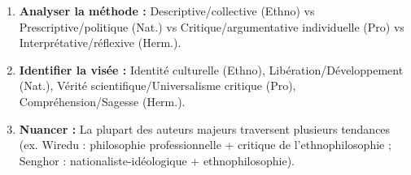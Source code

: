 \documentclass[11pt]{article}
\newcommand{\cle}[1]{{\popxbold\color{popdark}#1}}
\begin{document}
\begin{methode}
\begin{enumerate}
    \item \textbf{Analyser la méthode :} \cle{Descriptive/collective} (Ethno) vs \cle{Prescriptive/politique} (Nat.) vs \cle{Critique/argumentative individuelle} (Pro) vs \cle{Interprétative/réflexive} (Herm.).
    \item \textbf{Identifier la visée :} \cle{Identité culturelle} (Ethno), \cle{Libération/Développement} (Nat.), \cle{Vérité scientifique/Universalisme critique} (Pro), \cle{Compréhension/Sagesse} (Herm.).
    \item \textbf{Nuancer :} La plupart des auteurs majeurs traversent plusieurs tendances (ex. Wiredu : philosophie professionnelle + critique de l'ethnophilosophie ; Senghor : nationaliste-idéologique + ethnophilosophie).
\end{enumerate}
\end{methode}
\end{document}
